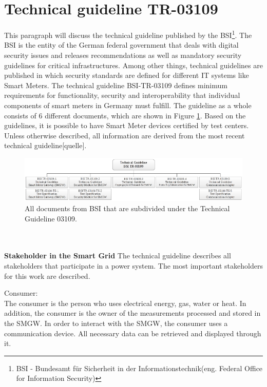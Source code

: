 \section{Technical guideline TR-03109}
This paragraph will discuss the technical guideline published by the BSI\footnote[3]{BSI - Bundesamt für Sicherheit in der Informationstechnik(eng. Federal Office for Information Security)}. The BSI is the entity of the German federal government that deals with digital security issues and releases recommendations as well as mandatory security guidelines for critical infrastructures. Among other things, technical guidelines are published in which security standards are defined for different IT systems like Smart Meters. The technical guideline BSI-TR-03109 defines minimum requirements for functionality, security and interoperability that individual components of smart meters in Germany must fulfill. The guideline as a whole consists of 6 different documents, which are shown in Figure \ref{fig:TG03109}. Based on the guidelines, it is possible to have Smart Meter devices certified by test centers. Unless otherwise described, all information are derived from the most recent technical guideline[quelle].\begin{figure}[tbp]
  \centering
  \includegraphics[width=1\textwidth]{images/BSI-TR-03109.png}
  \caption[Technical Guideline 03109 Overview]{All documents from BSI that are subdivided under the Technical Guideline 03109.}
  \label{fig:TG03109}
\end{figure}
\\%
\\
\textbf{Stakeholder in the Smart Grid}
The technical guideline describes all stakeholders that participate in a power system. The most important stakeholders for this work are described.
\\\item Consumer: \\
The consumer is the person who uses electrical energy, gas, water
or heat. In addition, the consumer is the owner of the measurements processed and stored in the SMGW. In order to interact with the SMGW, the consumer uses a communication device. All necessary data can be retrieved and displayed through it.\\
